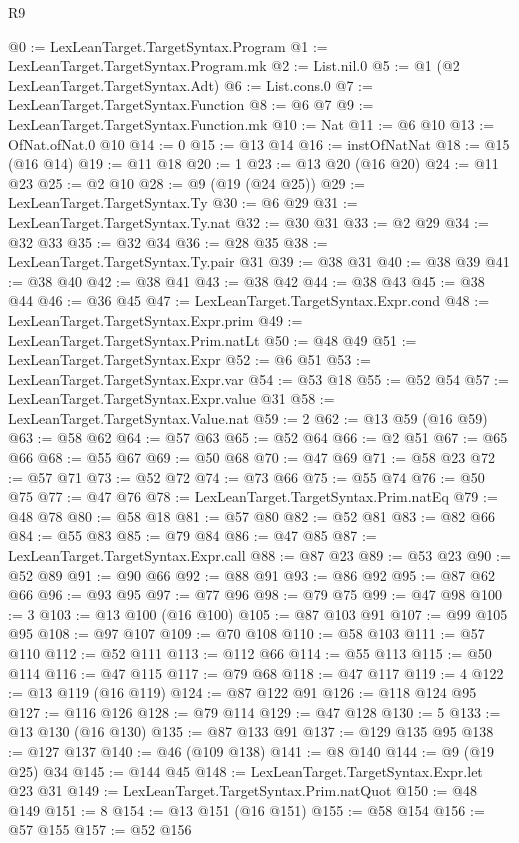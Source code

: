 \begin{lexlean}{R9}
\begin{coremodule}
@0 := LexLeanTarget.TargetSyntax.Program
@1 := LexLeanTarget.TargetSyntax.Program.mk
@2 := List.nil.{0}
@5 := @1 (@2 LexLeanTarget.TargetSyntax.Adt)
@6 := List.cons.{0}
@7 := LexLeanTarget.TargetSyntax.Function
@8 := @6 @7
@9 := LexLeanTarget.TargetSyntax.Function.mk
@10 := Nat
@11 := @6 @10
@13 := OfNat.ofNat.{0} @10
@14 := 0
@15 := @13 @14
@16 := instOfNatNat
@18 := @15 (@16 @14)
@19 := @11 @18
@20 := 1
@23 := @13 @20 (@16 @20)
@24 := @11 @23
@25 := @2 @10
@28 := @9 (@19 (@24 @25))
@29 := LexLeanTarget.TargetSyntax.Ty
@30 := @6 @29
@31 := LexLeanTarget.TargetSyntax.Ty.nat
@32 := @30 @31
@33 := @2 @29
@34 := @32 @33
@35 := @32 @34
@36 := @28 @35
@38 := LexLeanTarget.TargetSyntax.Ty.pair @31
@39 := @38 @31
@40 := @38 @39
@41 := @38 @40
@42 := @38 @41
@43 := @38 @42
@44 := @38 @43
@45 := @38 @44
@46 := @36 @45
@47 := LexLeanTarget.TargetSyntax.Expr.cond
@48 := LexLeanTarget.TargetSyntax.Expr.prim
@49 := LexLeanTarget.TargetSyntax.Prim.natLt
@50 := @48 @49
@51 := LexLeanTarget.TargetSyntax.Expr
@52 := @6 @51
@53 := LexLeanTarget.TargetSyntax.Expr.var
@54 := @53 @18
@55 := @52 @54
@57 := LexLeanTarget.TargetSyntax.Expr.value @31
@58 := LexLeanTarget.TargetSyntax.Value.nat
@59 := 2
@62 := @13 @59 (@16 @59)
@63 := @58 @62
@64 := @57 @63
@65 := @52 @64
@66 := @2 @51
@67 := @65 @66
@68 := @55 @67
@69 := @50 @68
@70 := @47 @69
@71 := @58 @23
@72 := @57 @71
@73 := @52 @72
@74 := @73 @66
@75 := @55 @74
@76 := @50 @75
@77 := @47 @76
@78 := LexLeanTarget.TargetSyntax.Prim.natEq
@79 := @48 @78
@80 := @58 @18
@81 := @57 @80
@82 := @52 @81
@83 := @82 @66
@84 := @55 @83
@85 := @79 @84
@86 := @47 @85
@87 := LexLeanTarget.TargetSyntax.Expr.call
@88 := @87 @23
@89 := @53 @23
@90 := @52 @89
@91 := @90 @66
@92 := @88 @91
@93 := @86 @92
@95 := @87 @62 @66
@96 := @93 @95
@97 := @77 @96
@98 := @79 @75
@99 := @47 @98
@100 := 3
@103 := @13 @100 (@16 @100)
@105 := @87 @103 @91
@107 := @99 @105 @95
@108 := @97 @107
@109 := @70 @108
@110 := @58 @103
@111 := @57 @110
@112 := @52 @111
@113 := @112 @66
@114 := @55 @113
@115 := @50 @114
@116 := @47 @115
@117 := @79 @68
@118 := @47 @117
@119 := 4
@122 := @13 @119 (@16 @119)
@124 := @87 @122 @91
@126 := @118 @124 @95
@127 := @116 @126
@128 := @79 @114
@129 := @47 @128
@130 := 5
@133 := @13 @130 (@16 @130)
@135 := @87 @133 @91
@137 := @129 @135 @95
@138 := @127 @137
@140 := @46 (@109 @138)
@141 := @8 @140
@144 := @9 (@19 @25) @34
@145 := @144 @45
@148 := LexLeanTarget.TargetSyntax.Expr.let @23 @31
@149 := LexLeanTarget.TargetSyntax.Prim.natQuot
@150 := @48 @149
@151 := 8
@154 := @13 @151 (@16 @151)
@155 := @58 @154
@156 := @57 @155
@157 := @52 @156

\end{coremodule}
\end{lexlean}
